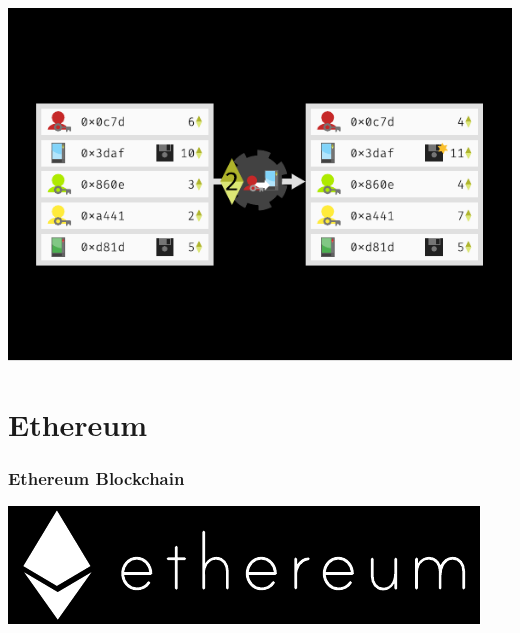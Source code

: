 \documentclass[xcolor=x11names,compress]{beamer}
\begin{document}
\begin{frame}
\begin{overprint}
\begin{center}
		\end{center}
		\begin{center}
			\includegraphics[width=\textwidth,height=0.8\textheight,keepaspectratio]{img/state/09.pdf}
		\end{center}
	\end{overprint}
\end{frame}

\section{Ethereum}
\begin{frame}
	\frametitle{Ethereum Blockchain}
	\begin{center}
		\includegraphics[width=\textwidth,height=0.8\textheight,keepaspectratio]{img/ethereum/logo.pdf}
	\end{center}
\end{frame}
\end{document}
